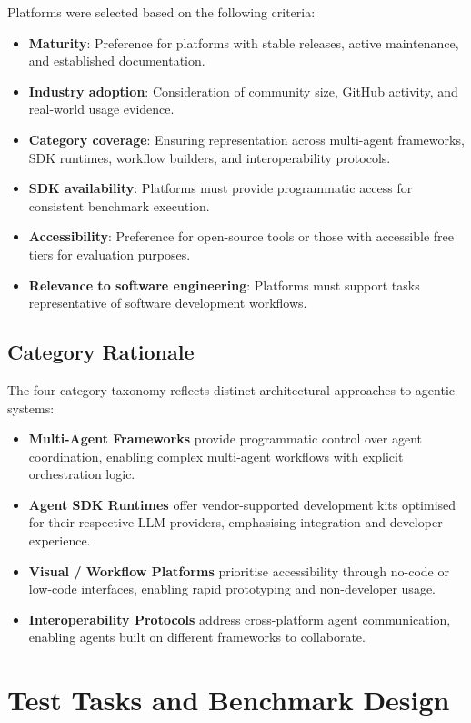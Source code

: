 \documentclass[]
{UCD_CS_FYP_Report}
\begin{document}
Platforms were selected based on the following criteria:

\begin{itemize}
  \item \textbf{Maturity}: Preference for platforms with stable releases, active maintenance, and established documentation.
  \item \textbf{Industry adoption}: Consideration of community size, GitHub activity, and real-world usage evidence.
  \item \textbf{Category coverage}: Ensuring representation across multi-agent frameworks, SDK runtimes, workflow builders, and interoperability protocols.
  \item \textbf{SDK availability}: Platforms must provide programmatic access for consistent benchmark execution.
  \item \textbf{Accessibility}: Preference for open-source tools or those with accessible free tiers for evaluation purposes.
  \item \textbf{Relevance to software engineering}: Platforms must support tasks representative of software development workflows.
\end{itemize}

\subsection{Category Rationale}

The four-category taxonomy reflects distinct architectural approaches to agentic systems:

\begin{itemize}
  \item \textbf{Multi-Agent Frameworks} provide programmatic control over agent coordination, enabling complex multi-agent workflows with explicit orchestration logic.
  \item \textbf{Agent SDK Runtimes} offer vendor-supported development kits optimised for their respective LLM providers, emphasising integration and developer experience.
  \item \textbf{Visual / Workflow Platforms} prioritise accessibility through no-code or low-code interfaces, enabling rapid prototyping and non-developer usage.
  \item \textbf{Interoperability Protocols} address cross-platform agent communication, enabling agents built on different frameworks to collaborate.
\end{itemize}

\section{Test Tasks and Benchmark Design}
\end{document}
